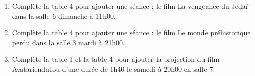 \documentclass[class=report,crop=false, 12pt]{standalone}
\begin{document}
\begin{activite}
\sauteligne

\begin{enumerate}
  \item Complète la table 4 pour ajouter une séance : le film \og La vengeance du Jedaï \fg{} dans la salle 6 dimanche à 11h00.
  
  \item Complète la table 4 pour ajouter une séance : le film \og Le monde préhistorique perdu \fg{} dans la salle 3 mardi à 21h00.  
  
  \item Complète la table 1 et la table 4 pour ajouter la projection du film 
  \og Avatariendutou \fg{} d'une durée de 1h40 le samedi à 20h00 en salle 7.
  
\end{enumerate}

\end{activite}
\end{document}
